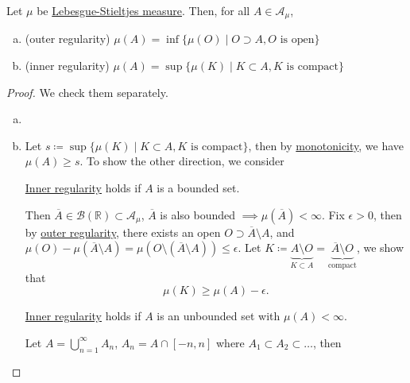 \begin{theorem}[Regularity]\label{thm:regularity}
	Let \(\mu\) be \hyperref[def:Lebesgue-Stieltjes-measure]{Lebesgue-Stieltjes measure}. Then, for all \(A\in \mathcal{A} _\mu \),
	\begin{enumerate}[(a)]
		\item\label{thm:outer-regularity} (outer regularity) \(\mu (A) = \inf \{\mu (O) \mid O\supset A, O\text{ is open}\}\)
		\item\label{thm:inner-regularity} (inner regularity) \(\mu (A) = \sup \{\mu (K) \mid K\subset A, K\text{ is compact}\}\)
	\end{enumerate}
\end{theorem}
\begin{proof}
	We check them separately.
	\begin{enumerate}[(a)]
		\item {}
		\item Let \(s \coloneqq \sup \{\mu (K) \mid K\subset A, K\text{ is compact} \}\), then by \hyperref[thm:measure-space-monotonicity]{monotonicity}, we have \(\mu (A)\geq s\).
		      To show the other direction, we consider
		      \begin{claim}
			      \hyperref[thm:inner-regularity]{Inner regularity} holds if \(A\) is a bounded set.
		      \end{claim}
		      \begin{explanation}
			      Then \(\overline{A} \in \mathcal{B} (\mathbb{R} )\subset \mathcal{A} _\mu \),
			      \(\overline{A} \) is also bounded \(\implies \mu (\overline{A} ) < \infty \). Fix \(\epsilon >0\), then by \hyperref[thm:outer-regularity]{outer regularity},
			      there exists an open \(O\supset \overline{A} \setminus A\), and \(\mu (O) - \mu (\overline{A} \setminus A) = \mu (O\setminus (\overline{A} \setminus A))\leq \epsilon \).
			      Let \(K\coloneqq \underbrace{A\setminus O}_{K\subset A} = \underbrace{\overline{A} \setminus O}_{\text{compact}}\), we show that
			      \[
				      \mu (K)\geq \mu (A) - \epsilon .
			      \]
		      \end{explanation}
		      \begin{claim}
			      \hyperref[thm:inner-regularity]{Inner regularity} holds if \(A\) is an unbounded set with \(\mu (A)<\infty \).
		      \end{claim}
		      \begin{explanation}
			      Let \(A = \bigcup_{n=1}^{\infty} A_{n}\), \(A_{n} = A\cap [-n, n]\) where
			      \(A_1\subset A_2\subset \dots  \), then

\end{explanation}
\end{enumerate}
\end{proof}
